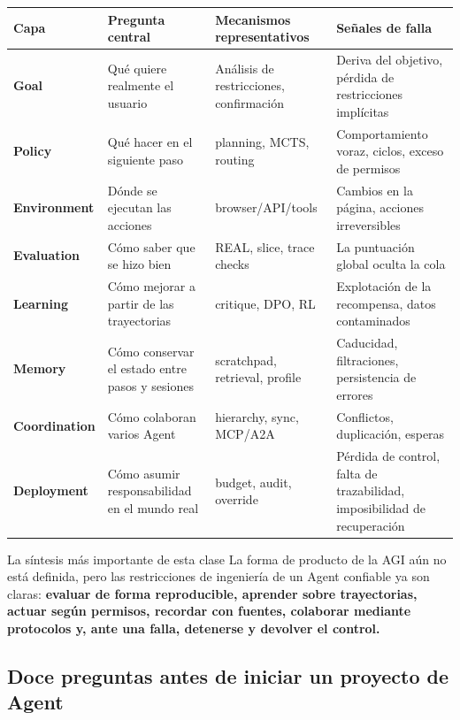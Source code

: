 \documentclass[a4paper]{article}
\begin{document}
\begin{center}
\begin{tabularx}{\textwidth}{>{\bfseries}p{} X X X}
Capa & Pregunta central & Mecanismos representativos & Señales de falla \\
\hline
Goal & Qué quiere realmente el usuario & Análisis de restricciones, confirmación & Deriva del objetivo, pérdida de restricciones implícitas \\
Policy & Qué hacer en el siguiente paso & planning, MCTS, routing & Comportamiento voraz, ciclos, exceso de permisos \\
Environment & Dónde se ejecutan las acciones & browser/API/tools & Cambios en la página, acciones irreversibles \\
Evaluation & Cómo saber que se hizo bien & REAL, slice, trace checks & La puntuación global oculta la cola \\
Learning & Cómo mejorar a partir de las trayectorias & critique, DPO, RL & Explotación de la recompensa, datos contaminados \\
Memory & Cómo conservar el estado entre pasos y sesiones & scratchpad, retrieval, profile & Caducidad, filtraciones, persistencia de errores \\
Coordination & Cómo colaboran varios Agent & hierarchy, sync, MCP/A2A & Conflictos, duplicación, esperas \\
Deployment & Cómo asumir responsabilidad en el mundo real & budget, audit, override & Pérdida de control, falta de trazabilidad, imposibilidad de recuperación \\
\end{tabularx}
\end{center}

\begin{importantbox}{La síntesis más importante de esta clase}
La forma de producto de la AGI aún no está definida, pero las restricciones de ingeniería de un Agent confiable ya son claras: \textbf{evaluar de forma reproducible, aprender sobre trayectorias, actuar según permisos, recordar con fuentes, colaborar mediante protocolos y, ante una falla, detenerse y devolver el control.}
\end{importantbox}

\subsection{Doce preguntas antes de iniciar un proyecto de Agent}
\end{document}
